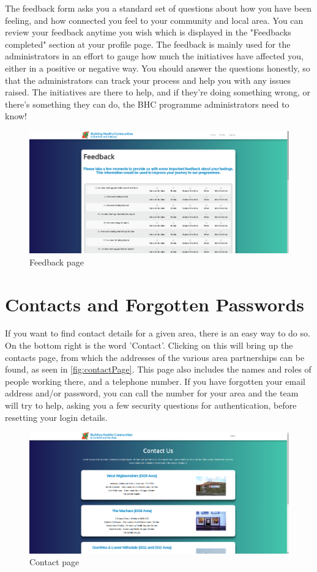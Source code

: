 \documentclass{bhcguides}
\begin{document}
The feedback form asks you a standard set of questions about how you have been feeling, and how connected you feel to your community and local area. You can review your feedback anytime you wish which is displayed in the "Feedbacks completed" section at your profile page. The feedback is mainly used for the administrators in an effort to gauge how much the initiatives have affected you, either in a positive or negative way. You should answer the questions honestly, so that the administrators can track your process and help you with any issues raised. The initiatives are there to help, and if they're doing something wrong, or there's something they can do, the BHC programme administrators need to know!

\begin{figure}[h]
 \centerline{\includegraphics[width=\textwidth, height=\textheight, keepaspectratio]{feedbackpage.png}}
 \caption{Feedback page}
 \label{fig:feedbackPage}
\end{figure}

\section{Contacts and Forgotten Passwords}
\label{sec:contacts}

If you want to find contact details for a given area, there is an easy way to do so. On the bottom right is the word 'Contact'. Clicking on this will bring up the contacts page, from which the addresses of the various area partnerships can be found, as seen in \autoref{fig:contactPage}. This page also includes the names and roles of people working there, and a telephone number. If you have forgotten your email address and/or password, you can call the number for your area and the team will try to help, asking you a few security questions for authentication, before resetting your login details.

\begin{figure}[h]
 \centerline{\includegraphics[width=\textwidth, height=\textheight, keepaspectratio]{contactpage.png}}
 \caption{Contact page}
 \label{fig:contactPage}
\end{figure}
\end{document}
